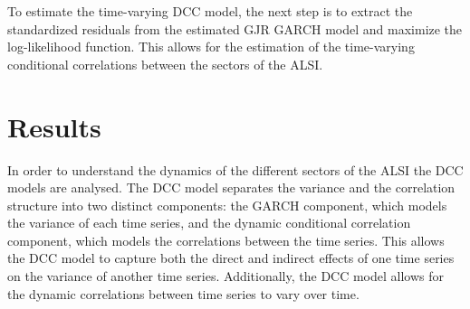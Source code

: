 \documentclass[11pt,preprint, authoryear]{elsarticle}
\let\origtable\table
\let\endorigtable\endtable
\renewenvironment{table}[1][2] {
    \expandafter\origtable\expandafter[H]
} {
    \endorigtable
}
\numberwithin{equation}{section}
\numberwithin{figure}{section}
\numberwithin{table}{section}
\begin{document}
To estimate the time-varying DCC model, the next step is to extract the
standardized residuals from the estimated GJR GARCH model and maximize
the log-likelihood function. This allows for the estimation of the
time-varying conditional correlations between the sectors of the ALSI.

\begin{table}[H]

\caption{\label{tab:univar}Univariate GJR GARCH Coefficients \label{univar}}
\centering
{}
\end{table}

\hypertarget{results}{%
\section{Results}\label{results}}

In order to understand the dynamics of the different sectors of the ALSI
the DCC models are analysed. The DCC model separates the variance and
the correlation structure into two distinct components: the GARCH
component, which models the variance of each time series, and the
dynamic conditional correlation component, which models the correlations
between the time series. This allows the DCC model to capture both the
direct and indirect effects of one time series on the variance of
another time series. Additionally, the DCC model allows for the dynamic
correlations between time series to vary over time.
\end{document}
